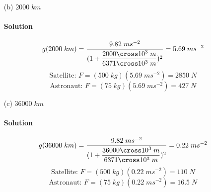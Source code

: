\documentclass{article}
\begin{document}
{\begin{enumerate}
		\paragraph{Solution} First to derive the dependence of the acceleration of gravity on height/distance from Earth using Newton's Law of Universal Gravitation. \unboldmath 
		\[
			F_g = G \frac{m_1 m_2}{r^2}
		\] \boldmath
		For an object on the surface of the Earth, $m_1 = M_E$, $m_2 = m$, and $r = R_E$. \unboldmath
		\[
			ma = G \frac{M_Em}{R_E^2}
		\]
		\[
			a = \frac{GM_E}{R_E^2} = \frac{(6.6743 \cross 10^{-11} \; Nm^2kg^{-2})(5.972 \cross 10^{24} \; kg)}{(6371 \cross 10^3 \; m)^2} = 9.82 \; ms^{-2} = g
		\]
		For an object a few kilometers off the surface of the Earth like a satellite or an astronaut, its as simple as adding the object's altitude in the denominator.
		\[
			mg = G \frac{M_Em}{(R_E + h)^2}
		\]
		\[
			g(h) = G \frac{M_E}{(R_E + h)^2} = \frac{GM_E}{R_E^2} \frac{1}{(1 + \dfrac{h}{R_E})^2} = \frac{g}{(1 + \dfrac{h}{R_E})^2}
		\]
		Now to use the derived dependence to find the acceleration of gravity at each altitude and the apparent weight for a $500 \; kg$ satellite and a $75 \; kg$ astronaut. This assumes that they are both stationary and not in orbit around the Earth, so the only force acting on them is gravity.
		\[
			g(400 \; km) = \frac{9.82 \; ms^{-2}}{(1 + \dfrac{400 \cross 10^3 \; m}{6371 \cross 10^3 \; m})^2} = 8.69 \; ms^{-2}
		\]
		\[
			\text{Satellite: } F = (500 \; kg)(8.69 \; ms^{-2}) = 4350 \; N
		\]
		\[
			\text{Astronaut: } F = (75 \; kg)(8.69 \; ms^{-2}) = 652 \; N
		\]
		\boldmath
		\item[(b)] $2000 \; km$
		\paragraph{Solution} \unboldmath
		\[
			g(2000 \; km) = \frac{9.82 \; ms^{-2}}{(1 + \dfrac{2000 \cross 10^3 \; m}{6371 \cross 10^3 \; m})^2} = 5.69 \; ms^{-2}
		\]
		\[
			\text{Satellite: } F = (500 \; kg)(5.69 \; ms^{-2}) = 2850 \; N
		\]
		\[
			\text{Astronaut: } F = (75 \; kg)(5.69 \; ms^{-2}) = 427 \; N
		\]
		\boldmath
		\item[(c)] $36000 \; km$
		\paragraph{Solution} \unboldmath
		\[
			g(36000 \; km) = \frac{9.82 \; ms^{-2}}{(1 + \dfrac{36000 \cross 10^3 \; m}{6371 \cross 10^3 \; m})^2} = 0.22 \; ms^{-2}
		\]
		\[
			\text{Satellite: } F = (500 \; kg)(0.22 \; ms^{-2}) = 110 \; N
		\]
		\[
			\text{Astronaut: } F = (75 \; kg)(0.22 \; ms^{-2}) = 16.5 \; N
		\]
		

\end{enumerate}}
\end{document}
